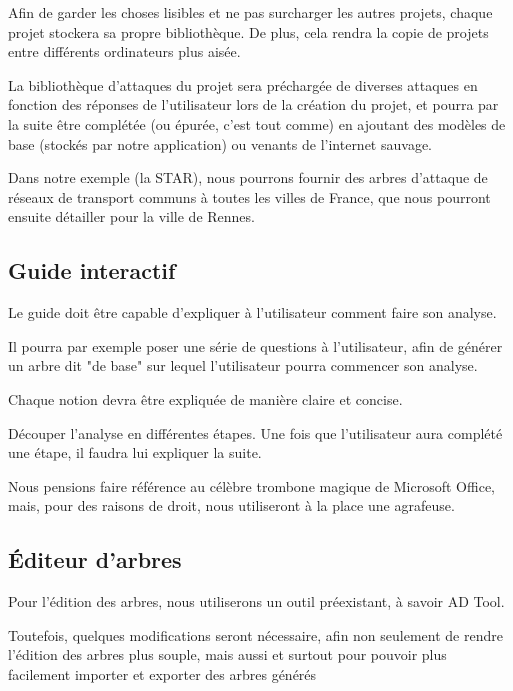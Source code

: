         Afin de garder les choses lisibles et ne pas surcharger les autres projets, chaque projet stockera sa propre bibliothèque. De plus, cela rendra la copie de projets entre différents ordinateurs plus aisée.
        
        La bibliothèque d'attaques du projet sera préchargée de diverses attaques en fonction des réponses de l'utilisateur lors de la création du projet, et pourra par la suite être complétée (ou épurée, c'est tout comme) en ajoutant des modèles de base (stockés par notre application) ou venants de l'internet sauvage.
        
        Dans notre exemple (la STAR), nous pourrons fournir des arbres d'attaque de réseaux de transport communs à toutes les villes de France, que nous pourront ensuite détailler pour la ville de Rennes.
      
    \subsection{Guide interactif}
        \label{subsec:guide_inter}
    	Le guide doit être capable d'expliquer à l'utilisateur comment faire son analyse. 
        
        Il pourra par exemple poser une série de questions à l'utilisateur, afin de générer un arbre dit "de base" sur lequel l'utilisateur pourra commencer son analyse.
        
        Chaque notion devra être expliquée de manière claire et concise.
        
        Découper l'analyse en différentes étapes. Une fois que l'utilisateur aura complété une étape, il faudra lui expliquer la suite.
        
        Nous pensions faire référence au célèbre trombone magique de Microsoft Office, mais, pour des raisons de droit, nous utiliseront à la place une agrafeuse.
        
    \subsection{\'Editeur d'arbres}
        \label{subsec:edit_arbre}
        Pour l'édition des arbres, nous utiliserons un outil préexistant, à savoir AD Tool\cite{adtool_paper}.  
        
        Toutefois, quelques modifications seront nécessaire, afin non seulement de rendre l'édition des arbres plus souple, mais aussi et surtout pour pouvoir plus facilement importer et exporter des arbres générés
        
